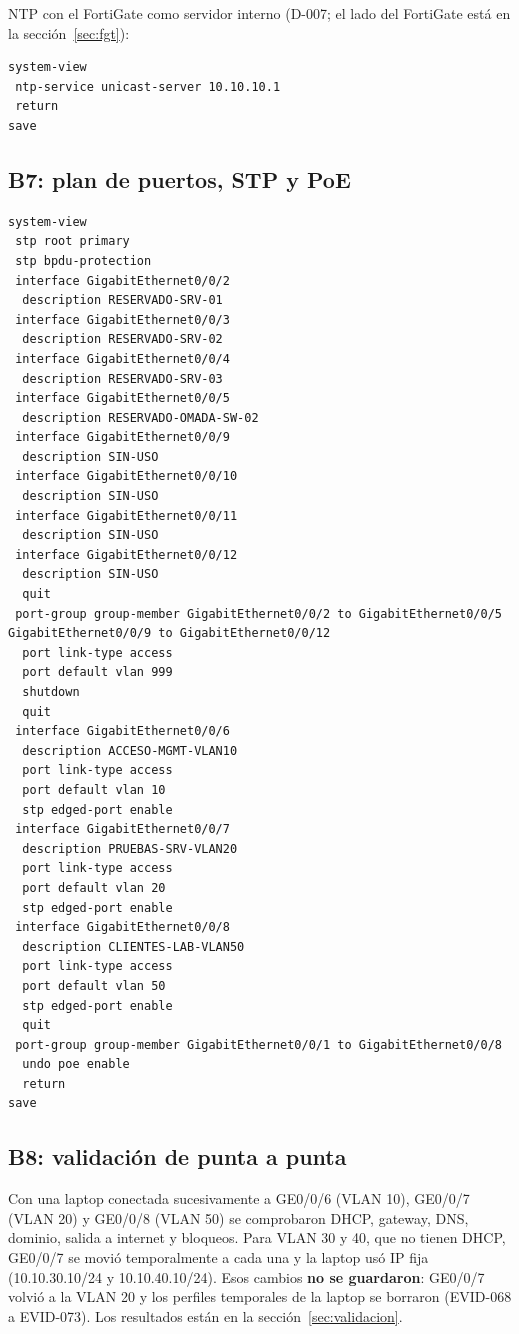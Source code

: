 \documentclass[11pt,a4paper]{article}
\begin{document}
NTP con el FortiGate como servidor interno (D-007; el lado del FortiGate está en la sección~\ref{sec:fgt}):

\begin{lstlisting}
system-view
 ntp-service unicast-server 10.10.10.1
 return
save
\end{lstlisting}

\subsection{B7: plan de puertos, STP y PoE}
\begin{lstlisting}
system-view
 stp root primary
 stp bpdu-protection
 interface GigabitEthernet0/0/2
  description RESERVADO-SRV-01
 interface GigabitEthernet0/0/3
  description RESERVADO-SRV-02
 interface GigabitEthernet0/0/4
  description RESERVADO-SRV-03
 interface GigabitEthernet0/0/5
  description RESERVADO-OMADA-SW-02
 interface GigabitEthernet0/0/9
  description SIN-USO
 interface GigabitEthernet0/0/10
  description SIN-USO
 interface GigabitEthernet0/0/11
  description SIN-USO
 interface GigabitEthernet0/0/12
  description SIN-USO
  quit
 port-group group-member GigabitEthernet0/0/2 to GigabitEthernet0/0/5 GigabitEthernet0/0/9 to GigabitEthernet0/0/12
  port link-type access
  port default vlan 999
  shutdown
  quit
 interface GigabitEthernet0/0/6
  description ACCESO-MGMT-VLAN10
  port link-type access
  port default vlan 10
  stp edged-port enable
 interface GigabitEthernet0/0/7
  description PRUEBAS-SRV-VLAN20
  port link-type access
  port default vlan 20
  stp edged-port enable
 interface GigabitEthernet0/0/8
  description CLIENTES-LAB-VLAN50
  port link-type access
  port default vlan 50
  stp edged-port enable
  quit
 port-group group-member GigabitEthernet0/0/1 to GigabitEthernet0/0/8
  undo poe enable
  return
save
\end{lstlisting}

\subsection{B8: validación de punta a punta}
Con una laptop conectada sucesivamente a GE0/0/6 (VLAN 10), GE0/0/7 (VLAN 20) y GE0/0/8 (VLAN 50) se comprobaron DHCP, gateway, DNS, dominio, salida a internet y bloqueos. Para VLAN 30 y 40, que no tienen DHCP, GE0/0/7 se movió temporalmente a cada una y la laptop usó IP fija (10.10.30.10/24 y 10.10.40.10/24). Esos cambios \textbf{no se guardaron}: GE0/0/7 volvió a la VLAN 20 y los perfiles temporales de la laptop se borraron (EVID-068 a EVID-073). Los resultados están en la sección~\ref{sec:validacion}.
\end{document}
